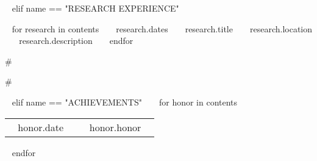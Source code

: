 \begin{minipage}{\textwidth}

~{ elif name == "RESEARCH EXPERIENCE" }~
\begin{entrylist}
~{ for research in contents }~
  \entry
    {~{{ research.dates }}~}
    {~{{ research.title }}~}
    {~{{ research.location }}~}
    {~{{ research.description }}~}
~{ endfor }~
\end{entrylist}

{#

    
#}


~{ elif name == "ACHIEVEMENTS" }~
  ~{ for honor in contents }~
    \begin{tabular}{ @{} p{32mm} p{135mm} @{} }
    {~{{ honor.date }}~} & {\small ~{{ honor.honor }}~}
    \end{tabular}
    \vspace{1mm}
  ~{ endfor }~



\end{minipage}
